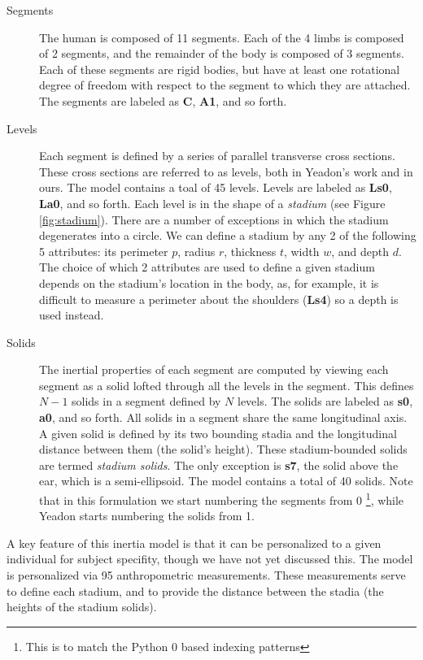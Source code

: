 \documentclass[10pt]{article}
\begin{document}
\begin{description}
    \item[Segments]
        The human is composed of 11 segments. Each of the 4 limbs is composed
        of 2 segments, and the remainder of the body is composed of 3 segments.
        Each of these segments are rigid bodies, but have at least one
        rotational degree of freedom with respect to the segment to which they
        are attached. The segments are labeled as \textbf{C}, \textbf{A1}, and
        so forth.
    \item[Levels]
        Each segment is defined by a series of parallel transverse cross sections.
        These cross sections are referred to as levels, both in
        Yeadon's work and in ours. The model contains a toal of 45 levels.
        Levels are labeled as \textbf{Ls0}, \textbf{La0}, and so forth.  Each
        level is in the shape of a \emph{stadium} (see Figure
        \ref{fig:stadium}). There are a number of exceptions in which the
        stadium degenerates into a circle. We can define a stadium by any 2 of
        the following 5 attributes: its perimeter $p$, radius $r$, thickness
        $t$, width $w$, and depth $d$. The choice of which 2 attributes are
        used to define a given stadium depends on the stadium's location in the
        body, as, for example, it is difficult to measure a perimeter about the
        shoulders (\textbf{Ls4}) so a depth is used instead.
    \item[Solids]
        The inertial properties of each segment are computed by viewing each
        segment as a solid lofted through all the levels in the segment. This
        defines $N-1$ solids in a segment defined by $N$ levels. The solids are
        labeled as \textbf{s0}, \textbf{a0}, and so forth. All solids in a
        segment share the same longitudinal axis. A given solid is
        defined by its two bounding stadia and the longitudinal distance
        between them (the solid's height). These stadium-bounded solids are
        termed \emph{stadium solids}. The only exception is \textbf{s7}, the
        solid above the ear, which is a semi-ellipsoid. The model contains a
        total of 40 solids.  Note that in this formulation we start numbering
        the segments from 0 \footnote{This is to match the Python 0 based
        indexing patterns}, while Yeadon starts numbering the solids from 1.
\end{description}

A key feature of this inertia model is that it can be personalized to a given
individual for subject specifity, though we have not yet discussed this. The
model is personalized via 95 anthropometric measurements. These measurements
serve to define each stadium, and to provide the distance between the stadia
(the heights of the stadium solids).
\end{document}
